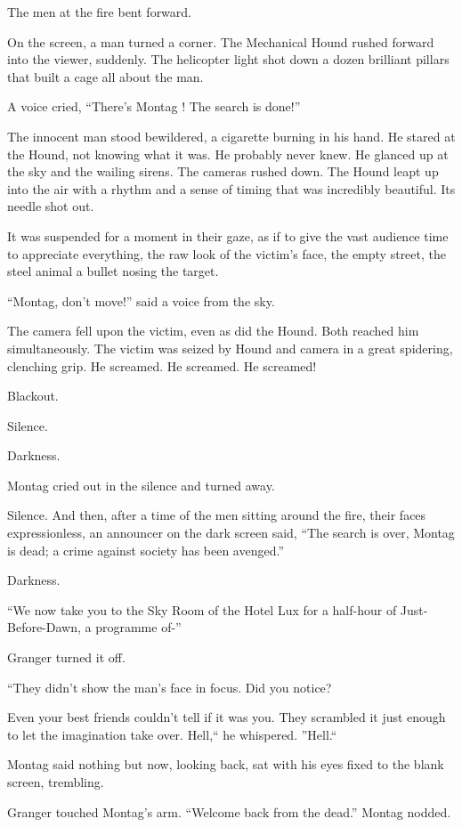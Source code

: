 \documentclass[11pt,openany]{book}
\begin{document}
The men at the fire bent forward.

On the screen, a man turned a corner. The Mechanical Hound rushed forward into the viewer, suddenly. The helicopter light shot down a dozen brilliant pillars that built a cage all about the man.

A voice cried, ``There's Montag ! The search is done!''

The innocent man stood bewildered, a cigarette burning in his hand. He stared at the Hound, not knowing what it was. He probably never knew. He glanced up at the sky and the wailing sirens. The cameras rushed down. The Hound leapt up into the air with a rhythm and a sense of timing that was incredibly beautiful. Its needle shot out.

It was suspended for a moment in their gaze, as if to give the vast audience time to appreciate everything, the raw look of the victim's face, the empty street, the steel animal a bullet nosing the target.

``Montag, don't move!'' said a voice from the sky.

The camera fell upon the victim, even as did the Hound. Both reached him simultaneously. The victim was seized by Hound and camera in a great spidering, clenching grip. He screamed. He screamed. He screamed!

Blackout.

Silence.

Darkness.

Montag cried out in the silence and turned away.

Silence. And then, after a time of the men sitting around the fire, their faces expressionless, an announcer on the dark screen said, ``The search is over, Montag is dead; a crime against society has been avenged.''

Darkness.

``We now take you to the Sky Room of the Hotel Lux for a half-hour of Just-Before-Dawn, a programme of-''

Granger turned it off.

``They didn't show the man's face in focus. Did you notice?

Even your best friends couldn't tell if it was you. They scrambled it just enough to let the imagination take over. Hell,`` he whispered. ''Hell.``

Montag said nothing but now, looking back, sat with his eyes fixed to the blank screen, trembling.

Granger touched Montag's arm. ``Welcome back from the dead.'' Montag nodded.
\end{document}
